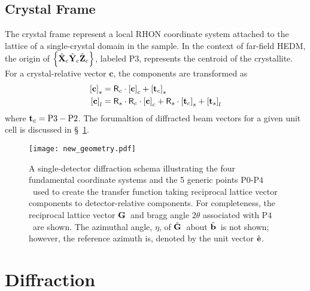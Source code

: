 \documentclass[12pt,letterpaper,final]{amsart}
\newcommand{\mbm}[1]{\ensuremath{\mbox{\boldmath$#1$}}}
\newcommand{\tvecs}{\ensuremath{\mbm{\mathrm{t}}_s}}
\newcommand{\tvecc}{\ensuremath{\mbm{\mathrm{t}}_c}}
\newcommand{\rmats}{\ensuremath{\mathsf{R}_s}}
\newcommand{\rmatc}{\ensuremath{\mathsf{R}_c}}
\newcommand{\gvec}{\ensuremath{\mbm{\mathrm{G}}}}
\newcommand{\ghat}{\ensuremath{\hat{\mbm{\mathrm{G}}}}}
\newcommand{\bhat}{\ensuremath{\hat{\mbm{\mathrm{b}}}}}
\newcommand{\ehat}{\ensuremath{\hat{\mbm{\mathrm{e}}}}}
\newcommand{\Pzero}{\ensuremath{\mathrm{P0}}}
\newcommand{\Ptwo}{\ensuremath{\mathrm{P2}}}
\newcommand{\Pthree}{\ensuremath{\mathrm{P3}}}
\newcommand{\Pfour}{\ensuremath{\mathrm{P4}}}
\newcommand{\Xc}{\ensuremath{\hat{\mbm{\mathrm{X}}}_c}}
\newcommand{\Yc}{\ensuremath{\hat{\mbm{\mathrm{Y}}}_c}}
\newcommand{\Zc}{\ensuremath{\hat{\mbm{\mathrm{Z}}}_c}}
\newcommand{\xtlframe}{\ensuremath{\left\{\Xc\Yc\Zc\right\}}}
\newcommand{\labcomps}[1]{\left[#1\right]_l}
\newcommand{\samcomps}[1]{\left[#1\right]_s}
\newcommand{\xtlcomps}[1]{\left[#1\right]_c}
\newcommand{\secref}[1]{\S~\ref{#1}}
\begin{document}
\subsection{Crystal Frame}\label{S:crystal}
The crystal frame represent a local RHON coordinate system attached to
the lattice of a single-crystal domain in the sample.  In the context
of far-field HEDM, the origin of \xtlframe, labeled \Pthree,
represents the centroid of the crystallite.  For a crystal-relative
vector $\mathbf{c}$, the components are transformed as
\begin{align}
  \samcomps{\mathbf{c}} &= \rmatc\cdot\xtlcomps{\mathbf{c}} + \samcomps{\tvecc}\\
  \labcomps{\mathbf{c}} &= \rmats\cdot\rmatc\cdot\xtlcomps{\mathbf{c}} + \rmats\cdot\samcomps{\tvecc} + \labcomps{\tvecs}
\end{align}
where $\tvecc=\Pthree-\Ptwo$.  The forumaltion of diffracted beam vectors for a given unit cell is discussed in \secref{S:diffraction}.
\begin{figure}[htb]
  \centering
  \texttt{[image: new\_geometry.pdf]}
  \caption{A single-detector diffraction schema illustrating the four fundamental coordinate systems and the 5 generic points \Pzero-\Pfour\ used to create the transfer function taking reciprocal lattice vector components to detector-relative components.  For completeness, the reciprocal lattice vector \gvec\ and bragg angle $2\theta$ associated with \Pfour\ are shown.  The azimuthal angle, $\eta$, of \ghat\ about \bhat\ is not shown; however, the reference azimuth is, denoted by the unit vector \ehat. }
  \label{F:diffraction_schema}
\end{figure}

\newpage
\section{Diffraction}\label{S:diffraction}
\end{document}
